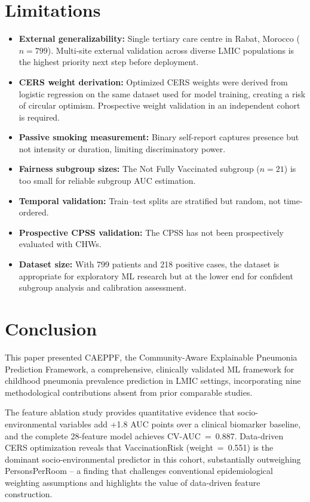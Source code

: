 \documentclass[3p,times,twocolumn]{elsarticle}
\begin{document}
\section{Limitations}
\begin{itemize}
\item \textbf{External generalizability:} Single tertiary care centre in Rabat, Morocco ($n=799$). Multi-site external validation across diverse LMIC populations is the highest priority next step before deployment.
\item \textbf{CERS weight derivation:} Optimized CERS weights were derived from logistic regression on the same dataset used for model training, creating a risk of circular optimism. Prospective weight validation in an independent cohort is required.
\item \textbf{Passive smoking measurement:} Binary self-report captures presence but not intensity or duration, limiting discriminatory power.
\item \textbf{Fairness subgroup sizes:} The Not Fully Vaccinated subgroup ($n=21$) is too small for reliable subgroup AUC estimation.
\item \textbf{Temporal validation:} Train--test splits are stratified but random, not time-ordered.
\item \textbf{Prospective CPSS validation:} The CPSS has not been prospectively evaluated with CHWs.
\item \textbf{Dataset size:} With 799 patients and 218 positive cases, the dataset is appropriate for exploratory ML research but at the lower end for confident subgroup analysis and calibration assessment.
\end{itemize}

\section{Conclusion}
This paper presented CAEPPF, the Community-Aware Explainable Pneumonia Prediction Framework, a comprehensive, clinically validated ML framework for childhood pneumonia prevalence prediction in LMIC settings, incorporating nine methodological contributions absent from prior comparable studies.

The feature ablation study provides quantitative evidence that socio-environmental variables add +1.8 AUC points over a clinical biomarker baseline, and the complete 28-feature model achieves CV-AUC~=~0.887. Data-driven CERS optimization reveals that VaccinationRisk (weight~=~0.551) is the dominant socio-environmental predictor in this cohort, substantially outweighing PersonsPerRoom -- a finding that challenges conventional epidemiological weighting assumptions and highlights the value of data-driven feature construction.
\end{document}
